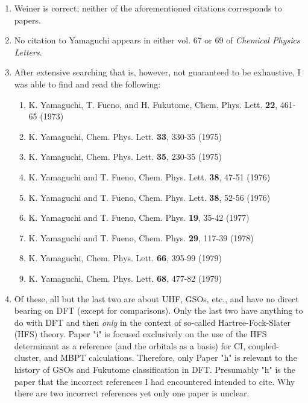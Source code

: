 \begin{enumerate}
\item Weiner is correct; neither of the aforementioned citations 
corresponds to papers.

\item No citation to Yamaguchi appears in either  vol. 67 or 69 of {\em %
Chemical Physics Letters}.

\item After extensive searching that is, however, not guaranteed to  be
exhaustive, I was able to find and read the following:  \vspace{-0.2cm}

\begin{enumerate}
\item K. Yamaguchi, T. Fueno, and H. Fukutome, Chem. Phys. Lett. {\bf 22}, 
461-65 (1973)

\item K. Yamaguchi, Chem. Phys. Lett. {\bf 33}, 330-35 (1975)

\item K. Yamaguchi, Chem. Phys. Lett. {\bf 35}, 230-35 (1975)

\item K. Yamaguchi and T. Fueno, Chem. Phys. Lett. {\bf 38}, 47-51 (1976)

\item K. Yamaguchi and T. Fueno, Chem. Phys. Lett. {\bf 38}, 52-56 (1976)

\item K. Yamaguchi and T. Fueno, Chem. Phys. {\bf 19}, 35-42 (1977)

\item K. Yamaguchi and T. Fueno, Chem. Phys. {\bf 29}, 117-39 (1978)

\item K. Yamaguchi, Chem. Phys. Lett. {\bf 66}, 395-99 (1979)

\item K. Yamaguchi, Chem. Phys. Lett. {\bf 68}, 477-82 (1979)
\end{enumerate}

\item Of these, all but the last two are about UHF, GSOs, etc.,  and have no
direct bearing on DFT (except for comparisons). Only  the last two have
anything to do with DFT and then {\em only}  in the context of so-called
Hartree-Fock-Slater (HFS) theory. Paper "i"  is focused exclusively on the
use of the HFS determinant as  a reference (and the orbitals as a basis) for
CI, coupled-cluster, and  MBPT calculations. Therefore, only Paper "h" is
relevant to the  history of GSOs and Fukutome classification in DFT.
Presumably  "h" is the paper that the incorrect references I had encountered
intended to cite. Why there are two incorrect references yet  only one paper
is unclear.


\end{enumerate}
